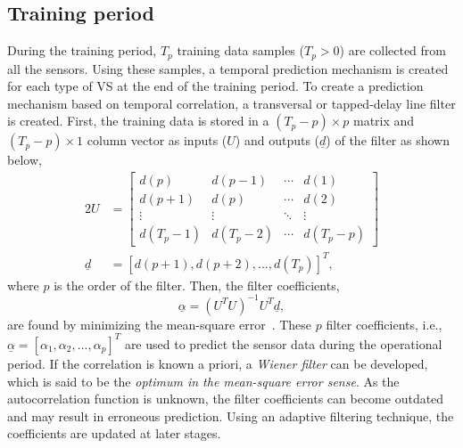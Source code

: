 \documentclass[a4paper,conference]{IEEEtran}
\begin{document}
\subsection{Training period}
During the training period, $T_{p}$ training data samples ($T_{p} > 0$) are collected from all the sensors. Using these samples, a temporal prediction mechanism is created for each type of VS at the end of the training period. To create a prediction mechanism based on temporal correlation, a transversal or tapped-delay line filter is created. First, the training data is stored in a $(T_{p}-p)\times p$ matrix and $(T_{p}-p)\times 1$ column vector as inputs ($ U $) and outputs ($\underline{d}$) of the filter as shown below, 
\begin{alignat}{2}
U & = \left[ \begin{array}{cccc}
d(p) & d(p-1) & \cdots & d(1) \\
d(p+1) & d(p) & \cdots & d(2) \\
\vdots & \vdots & \ddots & \vdots \\
d(T_{p}-1) & d(T_{p}-2) & \cdots & d(T_{p}-p)
\end{array} \right] \\
\underline{d} & = [d(p+1), d(p+2), ..., d(T_{p})]^{T}, 
\end{alignat}
where $p$ is the order of the filter. Then, the filter coefficients, 
\begin{equation}
\underline{\alpha} = (U^{T}U)^{-1}U^{T}\underline{d}, \label{eq:filcoeff}
\end{equation}
are found by minimizing the mean-square error~\cite{haykin2005adaptive}. These $p$ filter coefficients, i.e., $\underline{\alpha} = [\alpha_{1}, \alpha_{2}, ..., \alpha_{p}]^{T}$ are used to predict the sensor data during the operational period. If the correlation is known a priori, a {\it Wiener filter} can be developed, which is said to be the {\it optimum in the mean-square error sense}. As the autocorrelation function is unknown, the filter coefficients can become outdated and may result in erroneous prediction. Using an adaptive filtering technique, the coefficients are updated at later stages.
\end{document}
